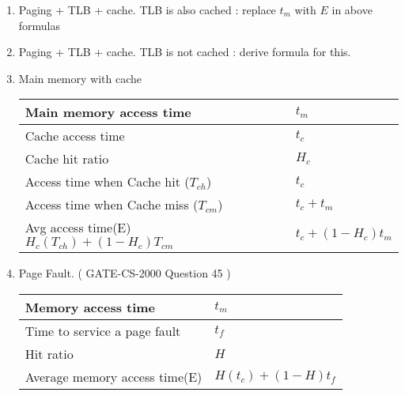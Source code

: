 \begin{enumerate}
        \item Paging + TLB + cache. TLB is also cached : replace \(t_m\)  with \(E\) in above formulas
        \item Paging + TLB + cache. TLB is not cached : derive formula for this.

    \item Main memory with cache

        \begin{myTableStyle}
            \begin{tabular}{ |m{6cm}|m{4cm}| } \hline
                Main memory access time             &   \(t_m\)                  \\ \hline
                Cache access time                     &   \(t_c\)                   \\ \hline
                Cache hit ratio                       &   \(H_c\)                   \\ \hline
                Access time when Cache hit (\(T_{ch}\)) &   \(t_c\)             \\ \hline
                Access time when Cache miss (\(T_{cm}\))&   \(t_c + t_m\)            \\ \hline

                \makecell[l]{ Avg access time(E) \\
                \(H_c(T_{ch}) + (1-H_c)T_{cm}\) }  &  \(t_c + (1-H_c)t_m\) \\ \hline
            \end{tabular}
        \end{myTableStyle}
        \vspace{0.08in}

    \item Page Fault. ( GATE-CS-2000 Question 45 )

        \begin{myTableStyle}
            \begin{tabular}{ |m{6cm}|m{4cm}| } \hline
                Memory access time                    &   \(t_m\)                  \\ \hline
                Time to service a page fault          &   \(t_f\)                   \\ \hline
                Hit ratio                             &   \(H\)                   \\ \hline
                Average memory access time(E)         &   \(H(t_c) + (1-H)t_f\)    \\ \hline
            \end{tabular}
        \end{myTableStyle}
        \vspace{0.08in}

\end{enumerate}
